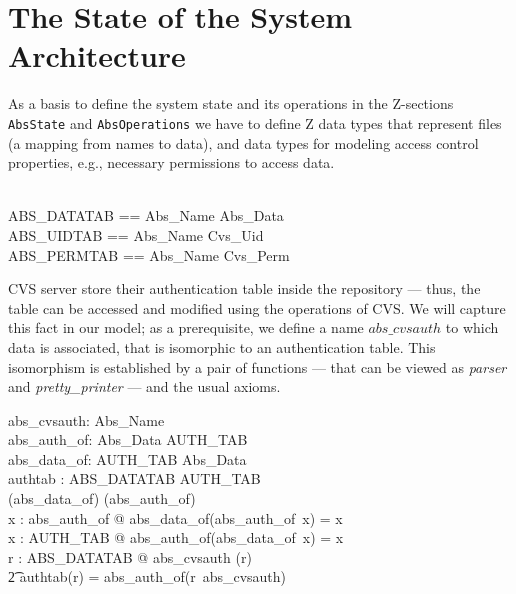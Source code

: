 \section{The State of the System Architecture}

\vspace{1ex}\noindent

As a basis to define the system state and its operations in the Z-sections
\texttt{AbsState} and \texttt{AbsOperations} we have to define Z data types that
represent files (a mapping from names to data), and data types for modeling
access control properties, e.g., necessary permissions to access data.
\begin{zed}
   \\
  ABS\_DATATAB == Abs\_Name \pfun Abs\_Data \\
  ABS\_UIDTAB == Abs\_Name \pfun Cvs\_Uid \\
  ABS\_PERMTAB == Abs\_Name \pfun Cvs\_Perm \\
\end{zed}
CVS server store their authentication table inside the repository --- thus, the
table can be accessed and modified using the operations of CVS\@. We will
capture this fact in our model; as a prerequisite, we define a name
$abs\_cvsauth$ to which data is associated, that is isomorphic to an
authentication table. This isomorphism is established by a pair of functions ---
that can be viewed as \emph{parser} and \emph{pretty\_printer} --- and the usual
axioms.
\begin{axdef}
  abs\_cvsauth: Abs\_Name \\
  abs\_auth\_of: Abs\_Data \pfun AUTH\_TAB \\
  abs\_data\_of: AUTH\_TAB \fun Abs\_Data \\
  authtab   : ABS\_DATATAB \pfun AUTH\_TAB \\
  \where
  \ran(abs\_data\_of) \subseteq \dom(abs\_auth\_of) \\
  \forall x : \dom abs\_auth\_of @ abs\_data\_of(abs\_auth\_of~x) = x \\
  \forall x : AUTH\_TAB @ abs\_auth\_of(abs\_data\_of~x) = x \\
  \forall r : ABS\_DATATAB @   abs\_cvsauth \in \dom(r) \implies \\
  \t2 authtab(r) = abs\_auth\_of(r~abs\_cvsauth) \\
\end{axdef}


